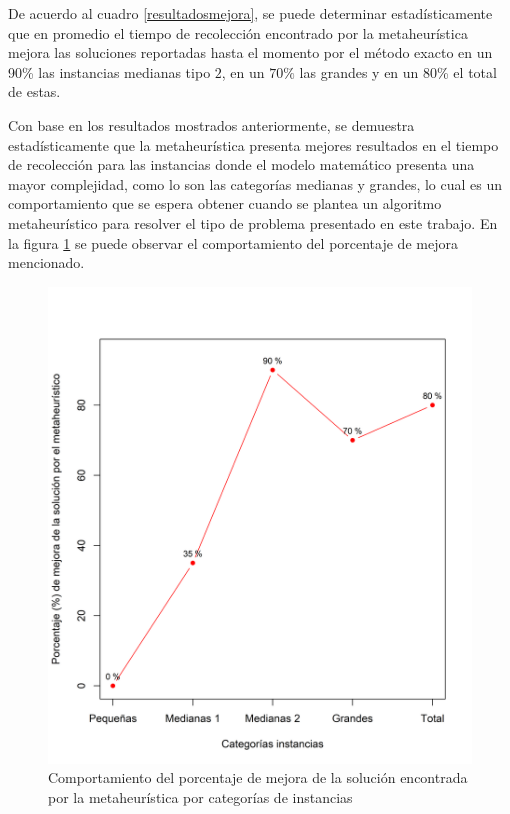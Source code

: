 \documentclass[preprint,12pt, pdftex]{elsarticle}
\begin{document}
De acuerdo al cuadro \ref{resultadosmejora}, se puede determinar estadísticamente que en promedio el tiempo de recolección encontrado por la metaheurística mejora las soluciones reportadas hasta el momento por el método exacto en un 90\% las instancias medianas tipo $2$, en un $70\%$ las grandes y en un 80\% el total de estas.

Con base en los resultados mostrados anteriormente, se demuestra estadísticamente que la metaheurística presenta mejores resultados en el tiempo de recolección para las instancias donde el modelo matemático presenta una mayor complejidad, como lo son las categorías medianas y grandes, lo cual es un comportamiento que se espera obtener cuando se plantea un algoritmo metaheurístico para resolver el tipo de problema presentado en este trabajo.  En la figura \ref{resumenmejoras} se puede observar el comportamiento del porcentaje de mejora mencionado.

\begin{figure}[h]
\centering
\includegraphics[scale = 0.6]{Figures/mejoras.png}
\caption{Comportamiento del porcentaje de mejora de la solución encontrada por la metaheurística por categorías de instancias}
\label{resumenmejoras}
\end{figure}
\end{document}
